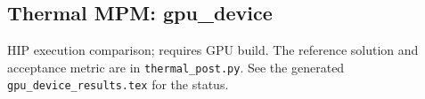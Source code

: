 \subsection{Thermal MPM: gpu\_device}
HIP execution comparison; requires GPU build. The reference solution and acceptance metric are in \texttt{thermal\_post.py}. See the generated \texttt{gpu\_device\_results.tex} for the status.

